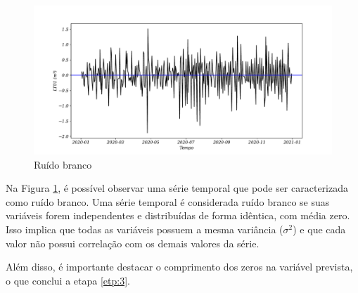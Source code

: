\begin{figure}[htp!]
	\centering
	\caption{Ruído branco}
	\label{fig:ruido-branco}
	\includegraphics[width=0.9\linewidth]{Resultados/Figuras/ruido-branco}
	
\end{figure}

Na Figura \ref{fig:ruido-branco}, é possível observar uma série temporal que pode ser caracterizada como ruído branco. Uma série temporal é considerada ruído branco se suas variáveis forem independentes e distribuídas de forma idêntica, com média zero. Isso implica que todas as variáveis possuem a mesma variância ($\sigma^2$) e que cada valor não possui correlação com os demais valores da série.

Além disso, é importante destacar o comprimento dos zeros na variável prevista, o que conclui a etapa \ref{etp:3}.